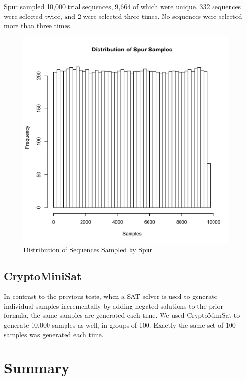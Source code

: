 Spur sampled 10,000 trial sequences, 9,664 of which were unique. 332 sequences were selected twice, and 2 were selected three times. No sequences were selected more than three times.

\begin{figure}[htb]
\centering
\centerline{\includegraphics[origin=c,width=12cm]{../figures/spur-samples.pdf}}
\caption{Distribution of Sequences Sampled by Spur}
\label{fig:spur_samples}
\end{figure}


\subsection{CryptoMiniSat}

In contrast to the previous tests, when a SAT solver is used to generate individual samples incrementally by adding negated solutions to the prior formula, the same samples are generated each time. We used CryptoMiniSat to generate 10,000 samples as well, in groups of 100. Exactly the same set of 100 samples was generated each time.


\section{Summary}

